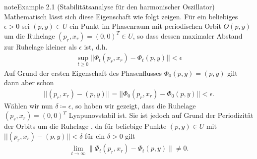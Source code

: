 \documentclass[letterpaper,10pt,english]{jupyterBook}
\begin{document}
\begin{sphinxadmonition}{note}{Example 2.1 (Stabilitätsanalyse für den harmonischer Oszillator)}
\sphinxAtStartPar
Mathematisch lässt sich diese Eigenschaft wie folgt zeigen.
Für ein beliebiges \(\epsilon > 0\) sei \((p,y) \in U\) ein Punkt im Phasenraum mit periodischen Orbit \(O(p,y)\) um die Ruhelage \((p_r,x_r) = (0,0)^T \in U\), so dass dessen maximaler Abstand zur Ruhelage kleiner als \(\epsilon\) ist, d.h.
\begin{equation*}
\begin{split}\sup_{t \geq 0} ||\Phi_t(p_r,x_r) - \Phi_t(p,y)|| < \epsilon\end{split}
\end{equation*}
\sphinxAtStartPar
Auf Grund der ersten Eigenschaft des Phasenflusses \(\Phi_0(p,y) = (p,y)\) gilt dann aber schon
\begin{equation*}
\begin{split}||(p_r, x_r) - (p,y)|| = ||\Phi_0(p_r, x_r) - \Phi_0(p,y)|| < \epsilon.\end{split}
\end{equation*}
\sphinxAtStartPar
Wählen wir nun \(\delta \coloneqq \epsilon\), so haben wir gezeigt, dass die Ruhelage \((p_r, x_r) = (0,0)^T\) Lyapunov\sphinxhyphen{}stabil ist.
Sie ist jedoch auf Grund der Periodizität der Orbits um die Ruhelage , da für beliebige Punkte \((p,y) \in U\) mit \(||(p_r,x_r) - (p,y)|| < \delta\) für ein \(\delta > 0\) gilt
\begin{equation*}
\begin{split}\lim_{t\to\infty}\|\Phi_t(p_r, x_r)-\Phi_t(p,y)\| \neq 0.\end{split}
\end{equation*}\end{sphinxadmonition}
\end{document}
